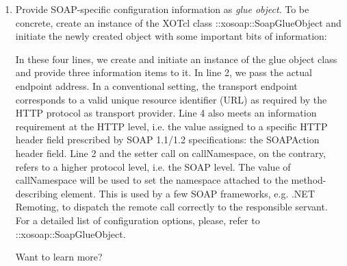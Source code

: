 \begin{enumerate}
\item Provide SOAP-specific configuration information as \emph{glue object}. To be concrete, create an instance of the XOTcl class ::xosoap::SoapGlueObject and initiate the newly created object with some important bits of information:

In these four lines, we create and initiate an instance of the glue object class and provide three information items to it. In line 2, we pass the actual endpoint address. In a conventional setting, the transport endpoint corresponds to a valid unique resource identifier (URL) as required by the HTTP protocol as transport provider. Line 4 also meets an information requirement at the HTTP level, i.e. the value assigned to a specific HTTP header field prescribed by SOAP 1.1/1.2 specifications: the SOAPAction header field. Line 2 and the setter call on callNamespace, on the contrary, refers to a higher protocol level, i.e. the SOAP level. The value of callNamespace will be used to set the namespace attached to the method-describing element. This is used by a few SOAP frameworks, e.g. .NET Remoting, to dispatch the remote call correctly to the responsible servant. For a detailed list of configuration options, please, refer to ::xosoap::SoapGlueObject.

Want to learn more?


\end{enumerate}
